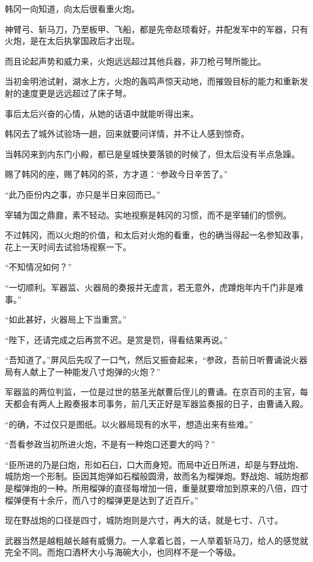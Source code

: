 韩冈一向知道，向太后很看重火炮。

神臂弓、斩马刀，乃至板甲、飞船，都是先帝赵顼看好，并配发军中的军器，只有火炮，是在太后执掌国政后才出现。

而且论起声势和威力来，火炮远远超过其他兵器，非刀枪弓弩所能比。

当初金明池试射，湖水上方，火炮的轰鸣声惊天动地，而摧毁目标的能力和重新发射的速度更是远远超过了床子弩。

事后太后兴奋的心情，从她的话语中就能听得出来。

韩冈去了城外试验场一趟，回来就要问详情，并不让人感到惊奇。

当韩冈来到内东门小殿，都已是皇城快要落锁的时候了，但太后没有半点急躁。

赐了韩冈的座，赐了韩冈的茶，方才道：“参政今日辛苦了。”

“此乃臣份内之事，亦只是半日来回而已。”

宰辅为国之鼎鼐，素不轻动。实地视察是韩冈的习惯，而不是宰辅们的惯例。

不过韩冈，而以火炮的价值，和太后对火炮的看重，也的确当得起一名参知政事，花上一天时间去试验场视察一下。

“不知情况如何？”

“一切顺利。军器监、火器局的奏报并无虚言，若无意外，虎蹲炮年内千门非是难事。”

“如此甚好，火器局上下当重赏。”

“陛下，还请完成之后再赏不迟。是赏是罚，得看结果再说。”

“吾知道了。”屏风后先叹了一口气，然后又振奋起来，“参政，吾前日听曹诵说火器局有人献上了一种能发八寸炮弹的火炮？”

军器监的两位判监，一位是过世的慈圣光献曹后侄儿的曹诵。在京百司的主官，每天都会有两人上殿奏报本司事务，前几天正好是军器监奏报的日子，由曹诵入殿。

“的确，不过仅只是图纸。以火器局现有的水平，想造出来有些难。”

“吾看参政当初所进火炮，不是有一种炮口还要大的吗？”

“臣所进的乃是臼炮，形如石臼，口大而身短。而局中近日所进，却是与野战炮、城防炮一个形制。臣因其炮弹如石榴般圆滑，故而名为榴弹炮。野战炮、城防炮都是榴弹炮的一种。所用榴弹的直径每增加一倍，重量就要增加到原来的八倍，四寸榴弹便有十余斤，而八寸的榴弹更是达到了近百斤。”

现在野战炮的口径是四寸，城防炮则是六寸，再大的话，就是七寸、八寸。

武器当然是越粗越长越有威慑力。一人拿着匕首，一人举着斩马刀，给人的感觉就完全不同。而炮口酒杯大小与海碗大小，也同样不是一个等级。

